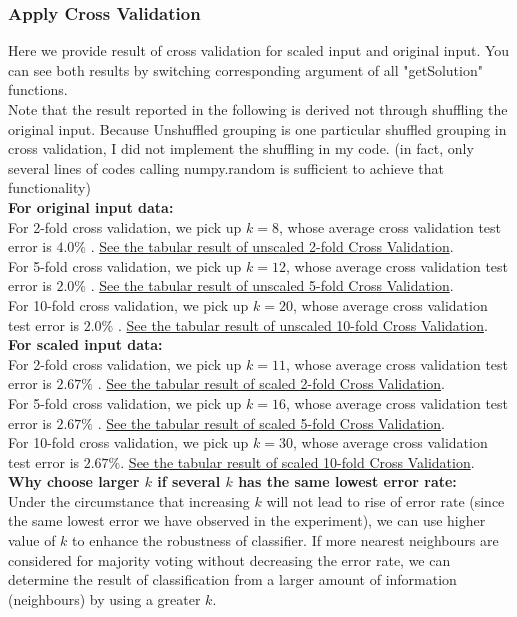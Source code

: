 \documentclass[11pt,a4paper]{article}
\newcommand{\htab}{\hspace*{0.63cm}}
\begin{document}
\subsubsection{Apply Cross Validation}
\htab Here we provide result of cross validation for scaled input and original input. You can see both results by switching corresponding argument of all "getSolution" functions. \\
\htab Note that the result reported in the following is derived not through shuffling the original input. Because Unshuffled grouping is one particular shuffled grouping in cross validation, I did not implement the shuffling in my code. (in fact, only several lines of codes calling numpy.random is sufficient to achieve that functionality)\\
\textbf{For original input data:} \\
\htab For 2-fold cross validation, we pick up $ k = 8 $, 
whose average cross validation test error is $ 4.0 \% $ . 
\hyperlink{twoFoldResultunNorm}{See the tabular result of unscaled 2-fold Cross Validation}. \\
\htab For 5-fold cross validation, we pick up $ k = 12 $, 
whose average cross validation test error is $ 2.0 \% $ . 
\hyperlink{fiveFoldResultunNorm}{See the tabular result of unscaled 5-fold Cross Validation}. \\
\htab For 10-fold cross validation, we pick up $ k = 20 $, 
whose average cross validation test error is $ 2.0 \% $ . 
\hyperlink{tenFoldResultunNorm}{See the tabular result of unscaled 10-fold Cross Validation}. \\[0.5cm]
\textbf{For scaled input data:} \\
\htab For 2-fold cross validation, we pick up $ k = 11 $, 
whose average cross validation test error is $ 2.67 \% $ . 
\hyperlink{twoFoldResultNorm}{See the tabular result of scaled 2-fold Cross Validation}. \\
\htab For 5-fold cross validation, we pick up $ k = 16 $, 
whose average cross validation test error is $ 2.67 \% $ . 
\hyperlink{fiveFoldResultNorm}{See the tabular result of scaled 5-fold Cross Validation}. \\
\htab For 10-fold cross validation, we pick up $ k = 30 $, 
whose average cross validation test error is $ 2.67 \% $. 
\hyperlink{tenFoldResultNorm}{See the tabular result of scaled 10-fold Cross Validation}. \\[0.5cm]
\textbf{Why choose larger $k$ if several $k$ has the same lowest error rate:} \\
\htab Under the circumstance that increasing $k$ will not lead to rise of error rate (since the same lowest error we have observed in the experiment), we can use higher value of $k$ to enhance the robustness of classifier. If more nearest neighbours are considered for majority voting without decreasing the error rate, we can determine the result of classification from a larger amount of information (neighbours) by using a greater $k$.
\end{document}
